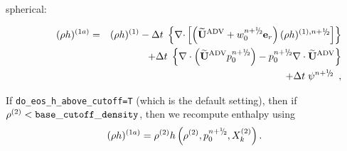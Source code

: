 \begin{description}
\begin{enumerate}
\begin{enumerate}
\begin{description}
\item[spherical:]

\begin{eqnarray}
(\rho h)^{(1a)} &=& (\rho h)^{(1)} - \dt \; \left\{ \nablab \cdotb \left[ \left(\uadvtwo+w_0^{\nph} \er\right)  
(\rho h)^{(1),\nph} \right] \right\} \nonumber \\
    && + \dt \; \left \{ \nabla \cdot \left (\uadvtwo p_0^{\nph} \right ) 
       - p_0^{\nph} \nabla \cdot \uadvtwo \right \} \nonumber \\
    && + \dt \; \psi^{\nph} \enskip ,
\end{eqnarray}

\end{description}

\end{enumerate}

If {\tt do\_eos\_h\_above\_cutoff=T} (which is the default setting), then if
$\rho^{(2)} < {\tt base\_cutoff\_density}$, then we recompute enthalpy using
\begin{equation}
(\rho h)^{(1a)} = \rho^{(2)}h\left(\rho^{(2)},p_0^{n+\myhalf},X_k^{(2)}\right).
\end{equation}


\end{enumerate}
\end{description}
